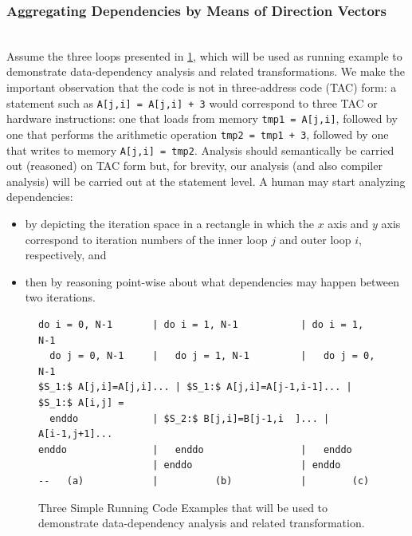 \documentclass[acmsmall,review]{acmart}\settopmatter{printfolios=true,printccs=false,printacmref=false}
\begin{document}
\subsubsection{Aggregating Dependencies by Means of Direction Vectors}
$\mbox{ }$\\

Assume the three loops presented in \cref{fig:data-dep-running-eg}, which
will be used as running example to demonstrate data-dependency analysis and
related transformations. We make the important observation that the code
is not in three-address code (TAC) form: a statement such as 
{\tt A[j,i] = A[j,i] + 3} would correspond to three TAC or hardware 
instructions: one that loads from memory {\tt tmp1 = A[j,i]}, followed 
by one that performs the arithmetic operation {\tt tmp2 = tmp1 + 3}, 
followed by one that writes to memory {\tt A[j,i] = tmp2}. Analysis 
should semantically be carried out (reasoned) on TAC form but, for brevity,
our analysis (and also compiler analysis) will be carried out at
the statement level.
A human may start analyzing dependencies:
\begin{itemize}
    \item by depicting the iteration space in a rectangle in which the $x$ 
        axis and $y$ axis correspond to iteration numbers of the inner 
        loop $j$ and outer loop $i$, respectively, and 
    \item then by reasoning point-wise about what dependencies may 
        happen between two iterations.
\end{itemize}  

\begin{figure}
\begin{lstlisting}[mathescape=true]
do i = 0, N-1       | do i = 1, N-1           | do i = 1, N-1
  do j = 0, N-1     |   do j = 1, N-1         |   do j = 0, N-1 
$S_1:$ A[j,i]=A[j,i]... | $S_1:$ A[j,i]=A[j-1,i-1]... | $S_1:$ A[i,j] =
  enddo             | $S_2:$ B[j,i]=B[j-1,i  ]... |       A[i-1,j+1]...
enddo               |   enddo                 |   enddo
                    | enddo                   | enddo
--   (a)            |          (b)            |        (c)        
\end{lstlisting}\vspace{-4ex}
\caption{Three Simple Running Code Examples that will be used to demonstrate data-dependency analysis and related transformation.}
\label{fig:data-dep-running-eg}
\end{figure}
\end{document}
